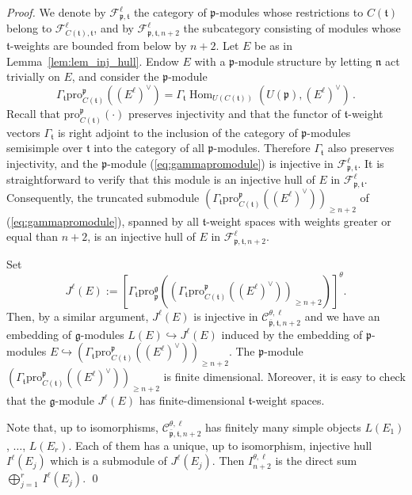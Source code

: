 \documentclass{tglat2e}
\theoremstyle{definition}
\theoremstyle{remark}
\renewcommand{\tt}{\mathfrak{t}}
\newcommand{\nn}{\mathfrak{n}}
\newcommand{\pp}{\mathfrak{p}}
\renewcommand{\gg}{\mathfrak{g}}
\newcommand{\FF}{\mathcal{F}}
\newcommand{\pro}{\mathrm{pro}}
\DeclareMathOperator{\Hom}{Hom}
\begin{document}
		
	\begin{proof} 
We denote by $\FF^\ell_{\pp,\tt}$ the category of $\pp$-modules whose restrictions to $C(\tt)$ belong to $\FF^\ell_{C(\tt),\tt}$, and by
$\FF^\ell_{\pp,\tt,n+2}$ the subcategory consisting of modules whose
$\tt$-weights are bounded from below by $n+2$. Let $E$ be as in Lemma~\ref{lem:lem_inj_hull}.  Endow $E$ with a $\pp$-module structure by letting $\nn$ act trivially on $E$, and consider the $\pp$-module
\begin{equation}
\Gamma_\tt \pro^{\pp}_{C(\tt)}\left(\left(E^{\ell}\right)^\vee\right)=\Gamma_\tt\Hom_{U(C(\tt))}\left(U(\pp),\left(E^{\ell}\right)^\vee\right)\,.
\label{eq:gammapromodule}
\end{equation}
Recall that $\pro^{\pp}_{C(\tt)}(\cdot)$ preserves injectivity and that the functor of $\tt$-weight vectors $\Gamma_\tt$ is right adjoint to the inclusion of the category of $\pp$-modules semisimple
over $\tt$ into the category of all $\pp$-modules.  Therefore $\Gamma_{\tt}$ also preserves injectivity, and the $\pp$-module (\ref{eq:gammapromodule})
is injective in $\FF^\ell_{\pp,\tt}$. It is straightforward to verify that
this module is an injective hull of $E$ in $\FF^\ell_{\pp,\tt}$.
Consequently, the truncated submodule $\left(\Gamma_\tt\pro^{\pp}_{C(\tt)}\left(\left(E^{\ell}\right)^\vee\right)\right)_{\geq n+2}$ of (\ref{eq:gammapromodule}), spanned by all 
$\tt$-weight spaces with
weights greater or equal than $n+2$, is an injective hull of $E$ in $\FF^\ell_{\pp,\tt,n+2}$. 

Set
$$J^\ell(E):=\left[\Gamma_\tt\pro^{\gg}_{\pp}\left(\left(\Gamma_\tt\pro^{\pp}_{C(\tt)}\left(\left(E^{\ell}\right)^\vee\right)\right)_{\geq n+2}\right)\right]^\theta.$$
Then, by a similar argument, $J^\ell(E)$ is injective in $\mathcal{C}^{\theta,\ell}_{\bar{\pp},\tt,n+2}$ and we have an embedding of $\gg$-modules 
$L(E)\hookrightarrow J^\ell(E)$ induced by the embedding
of $\pp$-modules $E\hookrightarrow\left(\Gamma_\tt\pro^{\pp}_{C(\tt)}\left(\left(E^{\ell}\right)^\vee\right)\right)_{\geq  n+2}$. 
The $\pp$-module
$\left(\Gamma_\tt\pro^{\pp}_{C(\tt)}\left(\left(E^{\ell}\right)^\vee\right)\right)_{\geq  n+2}$ is finite 
dimensional. Moreover, it is easy to check that the $\gg$-module
$J^\ell(E)$ has finite-dimensional $\tt$-weight spaces.

Note that, up to isomorphisms, $\mathcal{C}^{\theta,\ell}_{\bar{\pp},\tt,n+2}$ has finitely many simple objects $L(E_1)$, $\dots$, $ L(E_r)$. Each of them has a unique, up to isomorphism, injective hull
$I^\ell\left(E_j\right)$ which is a submodule of $J^\ell(E_j)$. Then $I^{\theta,\ell}_{n+2}$ is the direct sum $\bigoplus_{j=1}^r\,I^\ell\left(E_j\right)$.
	\qed\end{proof}
	
\end{document}
